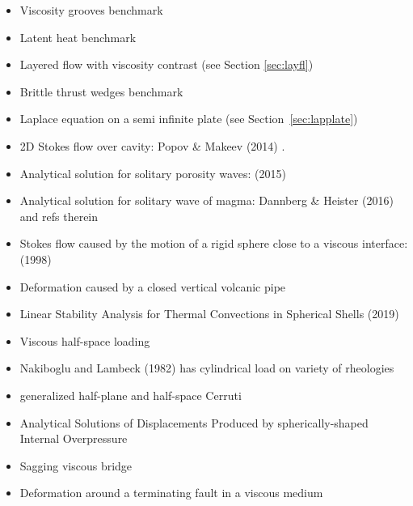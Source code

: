 \begin{itemize}
\item Viscosity grooves benchmark \cite{aspectmanual}

\item Latent heat benchmark \cite{aspectmanual}

\item Layered flow with viscosity contrast \cite{aspectmanual} 
      (see Section \ref{sec:layfl}) 

\item Brittle thrust wedges benchmark \cite{busa16,aspectmanual}

\item Laplace equation on a semi infinite plate (see Section~\ref{sec:lapplate})

\item 2D Stokes flow over cavity: Popov \& Makeev (2014) \cite{poma14}.


\item Analytical solution for solitary porosity waves: \textcite{copo15} (2015)

\item Analytical solution for solitary wave of magma: Dannberg \& Heister (2016) \cite{dahe16} and refs therein

\item Stokes flow caused by the motion of a rigid sphere close 
      to a viscous interface: \textcite{dagr98} (1998)

\item Deformation caused by a closed vertical volcanic pipe \cite{boda99}

\item Linear Stability Analysis for Thermal Convections in 
      Spherical Shells \textcite{yuwa19} (2019)

\item Viscous half-space loading \cite{hask35}

\item Nakiboglu and Lambeck (1982) has cylindrical load on variety of rheologies \cite{nala82}

\item generalized half-plane and half-space Cerruti \cite{nowi92,zhga15}

\item Analytical Solutions of Displacements Produced by spherically-shaped Internal Overpressure \cite{gech12}

\item Sagging viscous bridge \cite{stokes98}

\item Deformation around a terminating fault in a viscous medium \cite{baho96}

\end{itemize}


